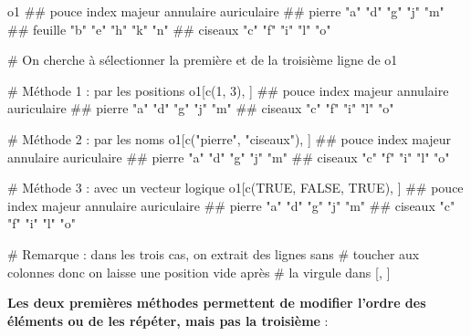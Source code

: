 \documentclass[12pt,twosided, notitlepage]{book}
\newenvironment{Shaded}{}{}
\newcommand{\KeywordTok}[1]{\textcolor[rgb]{0.00,0.00,1.00}{#1}}
\newcommand{\DecValTok}[1]{#1}
\newcommand{\StringTok}[1]{\textcolor[rgb]{0.00,0.50,0.50}{#1}}
\newcommand{\CommentTok}[1]{\textcolor[rgb]{0.00,0.50,0.00}{#1}}
\newcommand{\OtherTok}[1]{\textcolor[rgb]{1.00,0.25,0.00}{#1}}
\newcommand{\NormalTok}[1]{#1}
\renewenvironment{Shaded}{\begin{snugshade}}{\end{snugshade}}
\begin{document}
\begin{Shaded}
\begin{Highlighting}[]
\NormalTok{o1}
\NormalTok{  ##         pouce index majeur annulaire auriculaire}
\NormalTok{  ## pierre  "a"   "d"   "g"    "j"       "m"        }
\NormalTok{  ## feuille "b"   "e"   "h"    "k"       "n"        }
\NormalTok{  ## ciseaux "c"   "f"   "i"    "l"       "o"}

\CommentTok{# On cherche à sélectionner la première et de la troisième ligne de o1}

\CommentTok{# Méthode 1 : par les positions}
\NormalTok{o1[}\KeywordTok{c}\NormalTok{(}\DecValTok{1}\NormalTok{, }\DecValTok{3}\NormalTok{), ]}
\NormalTok{  ##         pouce index majeur annulaire auriculaire}
\NormalTok{  ## pierre  "a"   "d"   "g"    "j"       "m"        }
\NormalTok{  ## ciseaux "c"   "f"   "i"    "l"       "o"}

\CommentTok{# Méthode 2 : par les noms}
\NormalTok{o1[}\KeywordTok{c}\NormalTok{(}\StringTok{"pierre"}\NormalTok{, }\StringTok{"ciseaux"}\NormalTok{), ]}
\NormalTok{  ##         pouce index majeur annulaire auriculaire}
\NormalTok{  ## pierre  "a"   "d"   "g"    "j"       "m"        }
\NormalTok{  ## ciseaux "c"   "f"   "i"    "l"       "o"}

\CommentTok{# Méthode 3 : avec un vecteur logique}
\NormalTok{o1[}\KeywordTok{c}\NormalTok{(}\OtherTok{TRUE}\NormalTok{, }\OtherTok{FALSE}\NormalTok{, }\OtherTok{TRUE}\NormalTok{), ]}
\NormalTok{  ##         pouce index majeur annulaire auriculaire}
\NormalTok{  ## pierre  "a"   "d"   "g"    "j"       "m"        }
\NormalTok{  ## ciseaux "c"   "f"   "i"    "l"       "o"}

\CommentTok{# Remarque : dans les trois cas, on extrait des lignes sans}
\CommentTok{# toucher aux colonnes donc on laisse une position vide après}
\CommentTok{# la virgule dans [, ]}
\end{Highlighting}
\end{Shaded}

\textbf{Les deux premières méthodes permettent de modifier l'ordre des
éléments ou de les répéter, mais pas la troisième} :
\end{document}

